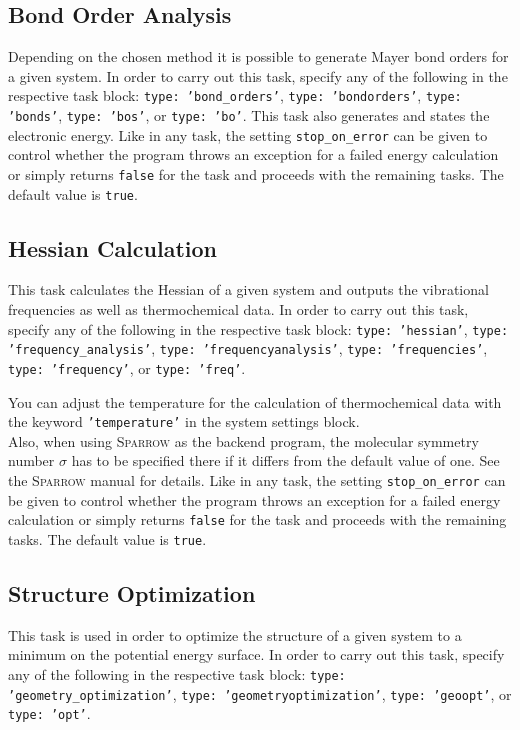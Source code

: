 \documentclass[]{tufte-book}
\begin{document}
\subsection{Bond Order Analysis}

Depending on the chosen method it is possible to generate Mayer bond orders for a given system. In order to carry out this task,
specify any of the following in the respective task block: \texttt{type: 'bond\_orders'}, \texttt{type: 'bondorders'},
\texttt{type: 'bonds'}, \texttt{type: 'bos'}, or \texttt{type: 'bo'}.
This task also generates and states the electronic energy.
Like in any task, the setting \texttt{stop\_on\_error} can be given to control whether the program throws an exception for a failed energy calculation or simply returns \texttt{false} for the task and proceeds with the remaining tasks. The default value is \texttt{true}.

\subsection{Hessian Calculation}

This task calculates the Hessian of a given system and outputs the vibrational frequencies as well as thermochemical data.
In order to carry out this task, specify any of the following in the respective task block: \texttt{type: 'hessian'},
\texttt{type: 'frequency\_analysis'}, \texttt{type: 'frequencyanalysis'}, \texttt{type: 'frequencies'}, \texttt{type: 'frequency'},
or \texttt{type: 'freq'}.

You can adjust the temperature for the calculation of thermochemical data with the keyword \texttt{'temperature'} in the system settings block.\\
Also, when using \textsc{Sparrow} %
as the backend program, the molecular symmetry number $\sigma$ has to be specified there if it differs from the
default value of one. See the \textsc{Sparrow} manual for details.
Like in any task, the setting \texttt{stop\_on\_error} can be given to control whether the program throws an exception for a failed energy calculation or simply returns \texttt{false} for the task and proceeds with the remaining tasks. The default value is \texttt{true}.

\subsection{Structure Optimization}

This task is used in order to optimize the structure of a given system to a minimum on the potential energy surface. In
order to carry out this task, specify any of the following in the respective task block: \texttt{type: 'geometry\_optimization'},
\texttt{type: 'geometryoptimization'}, \texttt{type: 'geoopt'}, or \texttt{type: 'opt'}.
\end{document}

